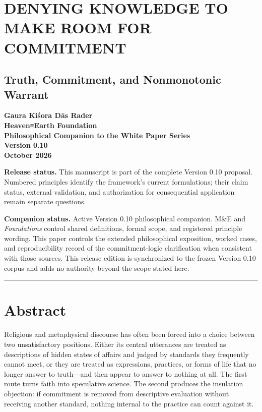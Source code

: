 \documentclass[
  11pt,
]{article}
\author{}
\date{}
\begin{document}
\section{DENYING KNOWLEDGE TO MAKE ROOM FOR
COMMITMENT}\label{denying-knowledge-to-make-room-for-commitment}

\subsection{Truth, Commitment, and Nonmonotonic
Warrant}\label{truth-commitment-and-nonmonotonic-warrant}

\textbf{Gaura Kiśora Dās Rader}\\
\textbf{Heaven≡Earth Foundation}\\
\textbf{Philosophical Companion to the White Paper Series}\\
\textbf{Version 0.10}\\
\textbf{October 2026}

\textbf{Release status.} This manuscript is part of the complete Version
0.10 proposal. Numbered principles identify the framework's current
formulations; their claim status, external validation, and authorization
for consequential application remain separate questions.

\textbf{Companion status.} Active Version 0.10 philosophical companion.
M\&E and \emph{Foundations} control shared definitions, formal scope,
and registered principle wording. This paper controls the extended
philosophical exposition, worked cases, and reproducibility record of
the commitment-logic clarification when consistent with those sources.
This release edition is synchronized to the frozen Version 0.10 corpus
and adds no authority beyond the scope stated here.

\begin{center}\rule{0.5\linewidth}{0.5pt}\end{center}

\section{Abstract}\label{abstract}

Religious and metaphysical discourse has often been forced into a choice
between two unsatisfactory positions. Either its central utterances are
treated as descriptions of hidden states of affairs and judged by
standards they frequently cannot meet, or they are treated as
expressions, practices, or forms of life that no longer answer to
truth---and then appear to answer to nothing at all. The first route
turns faith into speculative science. The second produces the insulation
objection: if commitment is removed from descriptive evaluation without
receiving another standard, nothing internal to the practice can count
against it.
\end{document}
